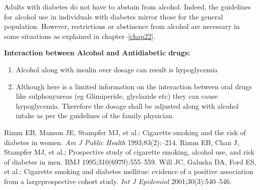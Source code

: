 Adults with diabetes do not have to abstain from alcohol. Indeed, the guidelines for alcohol use in individuals with diabetes mirror those for the general population. However, restrictions or abstinence from alcohol are necessary in some situations as explained in chapter–\ref{chap22}.

\noindent\textbf{Interaction between Alcohol and Antidiabetic drugs:}

\begin{enumerate}[•]
\itemsep=0pt
\item Alcohol along with insulin over dosage can result is hypoglycemia
\item Although here is a limited information on the interaction between oral drugs like sulphonyureas (eg Glimiperide, glyclazide etc) they can cause hypoglycemia. Therefore the dosage shall be adjusted along with alcohol intake as per the guidelines of the family physician.
\end{enumerate}

\begin{thebibliography}{99}
 Rimm EB, Manson JE, Stampfer MJ, et al.: Cigarette smoking and the risk of diabetes in women. \textit{Am J Public Health} 1993;83(2):–214.
 Rimm EB, Chan J, Stampfer MJ, et al.; Prospective study of cigarette smoking, alcohol use, and risk of diabetes in men. BMJ 1995;310(6979):555–559.
 Will JC, Galuska DA, Ford ES, et al.: Cigarette smoking and dia\-betes mellitus: evidence of a positive association from a large\break prospective cohort study. \textit{Int J Epidemiol} 2001;30(3):540–546.
\end{thebibliography}


